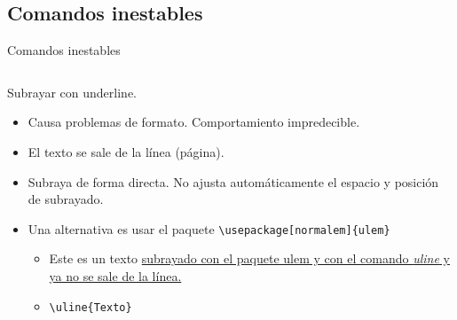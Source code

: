 \documentclass[aspectratio=169, 10pt]{beamer}
\begin{document}
\subsection{Comandos inestables}
\begin{frame}[fragile]{Comandos inestables}
    \begin{columns}
        \begin{column}{.8\linewidth}    
            \begin{block}{Subrayar con underline.}
            \begin{itemize} \pause
                \item Causa problemas de formato. Comportamiento impredecible.
                \item El texto se sale de la línea (página). 
                \item Subraya de forma directa. No ajusta automáticamente el espacio y posición de subrayado.
                \item Una alternativa es usar el paquete \verb|\usepackage[normalem]{ulem}|
                    \begin{itemize}
                        \item Este es un texto \uline{subrayado con el paquete ulem y con el comando \emph{uline} y ya no se sale de la línea.}
                        \item \verb|\uline{Texto}|
                    \end{itemize}
            \end{itemize}
            \end{block} 
        \end{column}    
    \end{columns}
\end{frame}
\end{document}
